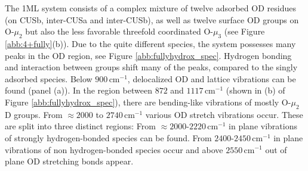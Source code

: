 \documentclass[11pt,DIV=13,BCOR=5mm,a4paper,headinclude]{scrbook}
\begin{document}
The 1ML system consists of a complex mixture of twelve adsorbed OD residues (on CUSb, inter-CUSa and inter-CUSb), as well as twelve surface OD groups on O-$\mu_2$ but also the less favorable threefold coordinated O-$\mu_3$ (see Figure \ref{abb:4+fully}(b)).
Due to the quite different species, the system possesses many peaks in the OD region, see Figure \ref{abb:fullyhydrox_spec}.
Hydrogen bonding and interaction between groups shift many of the peaks, compared to the singly adsorbed species.
Below $900\,$cm$^{-1}$, delocalized OD and lattice vibrations can be found (panel (a)).
In the region between $872$ and $1117\,$cm$^{-1}$ (shown in (b) of Figure \ref{abb:fullyhydrox_spec}), there are bending-like vibrations of mostly O-$\mu_2$D groups.
From $\approx2000$ to $2740\,$cm$^{-1}$ various OD stretch vibrations occur.
These are split into three distinct regions: From $\approx 2000$-$2220\,$cm$^{-1}$ in plane vibrations of strongly hydrogen-bonded species can be found.
From $2400$-$2450\,$cm$^{-1}$ in plane vibrations of non hydrogen-bonded species occur and above $2550\,$cm$^{-1}$ out of plane OD stretching bonds appear.
\end{document}
